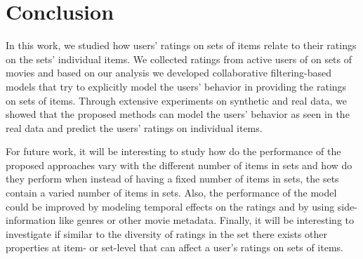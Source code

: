 \section{Conclusion} \label{ch:lfs:conclusion}
In this work, we studied how users' ratings on sets of items relate to their
ratings on the sets' individual items. 
We collected ratings from active users of \ML on sets of movies and based
on our analysis we developed collaborative filtering-based models that try to explicitly model the
users' behavior in providing the ratings on sets of items.
Through extensive experiments on synthetic and real data, we showed that the
proposed methods can model the users' behavior as seen in the real data and
predict the users' ratings on individual items.


For future work, it will be interesting to study how do the performance of the proposed
approaches vary with the different number of items in sets and how do they
perform when instead of having a fixed number of items in sets, the sets contain
a varied number of items in sets.
Also, the performance of the model could be improved by modeling
temporal effects on the ratings and by using side-information like genres or
other movie metadata. Finally, it will be interesting to investigate if similar to the diversity of
ratings in the set there exists other properties at item- or set-level
that can affect a user's ratings on sets of items.


